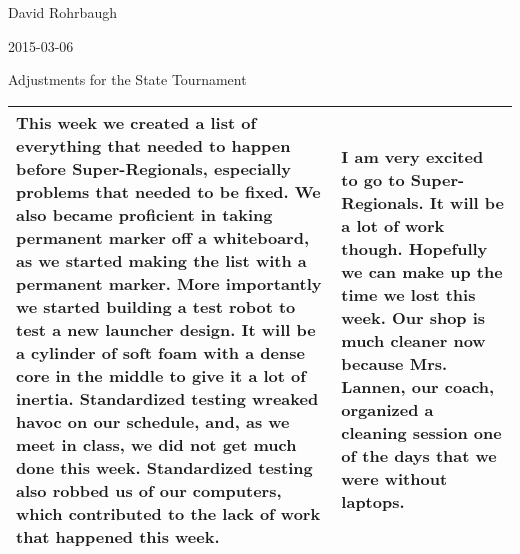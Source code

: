 David Rohrbaugh

2015-03-06

Adjustments for the State Tournament

\begin{tabular}{|p{5cm}|p{5cm}|}
 \hline
 This week we created a list of everything that needed to happen before Super-Regionals, especially problems that needed to be fixed. We also became proficient in taking permanent marker off a whiteboard, as we started making the list with a permanent marker. More importantly we started building a test robot to test a new launcher design. It will be a cylinder of soft foam with a dense core in the middle to give it a lot of inertia. Standardized testing wreaked havoc on our schedule, and, as we meet in class, we did not get much done this week. Standardized testing also robbed us of our computers, which contributed to the lack of work that happened this week.&
 I am very excited to go to Super-Regionals. It will be a lot of work though. Hopefully we can make up the time we lost this week. Our shop is much cleaner now because Mrs. Lannen, our coach, organized a cleaning session one of the days that we were without laptops.\\
 \hline
\end{tabular}
